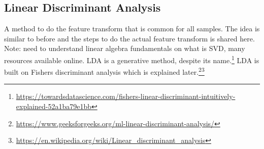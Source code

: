   \subsection{Linear Discriminant Analysis}
  
  A method to do the feature transform that is common for all samples. The idea is similar to before and the steps to do the actual feature transform is shared here. Note: need to understand linear algebra fundamentals on what is SVD, many resources available online. LDA is a generative method, despite its name.\footnote{\url{https://towardsdatascience.com/fishers-linear-discriminant-intuitively-explained-52a1ba79e1bb}} LDA is built on Fishers discriminant analysis which is explained later.\footnote{\url{https://www.geeksforgeeks.org/ml-linear-discriminant-analysis/}}\footnote{\url{https://en.wikipedia.org/wiki/Linear_discriminant_analysis}}
  
